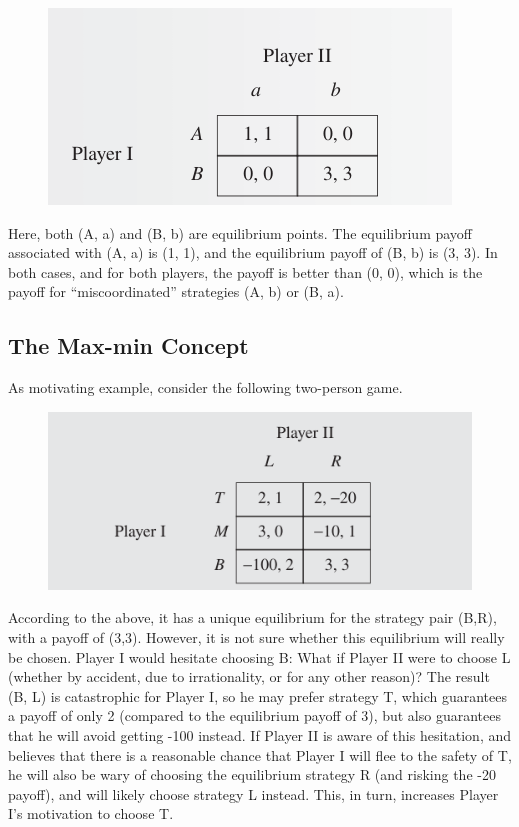 \begin{figure}[H]
    \centering
    \includegraphics[scale=0.75]{images/2023-10-10-game_theory_31.png}
\end{figure}

Here, both (A, a) and (B, b) are equilibrium points. The equilibrium payoff associated with (A, a) is (1, 1), and the equilibrium payoff of (B, b) is (3, 3). In both cases, and for both players, the payoff is better than (0, 0), which is the payoff for “miscoordinated” strategies (A, b) or (B, a).


\subsection{The Max-min Concept}

As motivating example, consider the following two-person game.

\begin{figure}[H]
    \centering
    \includegraphics[scale=0.75]{images/2023-10-10-game_theory_40.png}
\end{figure}

According to the above, it has a unique equilibrium for the strategy pair (B,R), with a payoff of (3,3). However, it is not sure whether this equilibrium will really be chosen. Player I would hesitate choosing B: What if Player II were to choose L (whether by accident, due to irrationality, or for any other reason)? The result (B, L) is catastrophic for Player I, so he may prefer strategy T, which guarantees a payoff of only 2 (compared to the equilibrium payoff of 3), but also guarantees that he will avoid getting -100 instead. If Player II is aware of this hesitation, and believes that there is a reasonable chance that Player I will flee to the safety of T, he will also be wary of choosing the equilibrium strategy R (and risking the -20 payoff), and will likely choose strategy L instead. This, in turn, increases Player I’s motivation to choose T.

